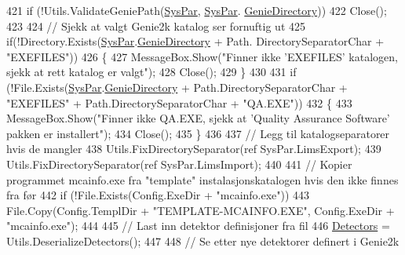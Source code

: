 \begin{DoxyCode}
421                 \textcolor{keywordflow}{if} (!Utils.ValidateGeniePath(\hyperlink{class_scintilab_1_1_form_main_ad41498eb151a72c77ad94c7285d0f506}{SysPar}, \hyperlink{class_scintilab_1_1_form_main_ad41498eb151a72c77ad94c7285d0f506}{SysPar}.
      \hyperlink{class_scintilab_1_1_system_parameters_a0a5d782455fab30269e4cd8263f89e99}{GenieDirectory}))
422                     Close();
423 
424                 \textcolor{comment}{// Sjekk at valgt Genie2k katalog ser fornuftig ut}
425                 \textcolor{keywordflow}{if}(!Directory.Exists(\hyperlink{class_scintilab_1_1_form_main_ad41498eb151a72c77ad94c7285d0f506}{SysPar}.\hyperlink{class_scintilab_1_1_system_parameters_a0a5d782455fab30269e4cd8263f89e99}{GenieDirectory} + Path.
      DirectorySeparatorChar + \textcolor{stringliteral}{"EXEFILES"}))
426                 \{
427                     MessageBox.Show(\textcolor{stringliteral}{"Finner ikke 'EXEFILES' katalogen, sjekk at rett katalog er valgt"});
428                     Close();
429                 \}
430 
431                 \textcolor{keywordflow}{if} (!File.Exists(\hyperlink{class_scintilab_1_1_form_main_ad41498eb151a72c77ad94c7285d0f506}{SysPar}.\hyperlink{class_scintilab_1_1_system_parameters_a0a5d782455fab30269e4cd8263f89e99}{GenieDirectory} + Path.DirectorySeparatorChar + \textcolor{stringliteral}{
      "EXEFILES"} + Path.DirectorySeparatorChar + \textcolor{stringliteral}{"QA.EXE"}))
432                 \{
433                     MessageBox.Show(\textcolor{stringliteral}{"Finner ikke QA.EXE, sjekk at 'Quality Assurance Software' pakken er
       installert"});
434                     Close();
435                 \}
436 
437                 \textcolor{comment}{// Legg til katalogseparatorer hvis de mangler}
438                 Utils.FixDirectorySeparator(ref SysPar.LimsExport);
439                 Utils.FixDirectorySeparator(ref SysPar.LimsImport);
440 
441                 \textcolor{comment}{// Kopier programmet mcainfo.exe fra "template" instalasjonskatalogen hvis den ikke finnes
       fra før}
442                 \textcolor{keywordflow}{if} (!File.Exists(Config.ExeDir + \textcolor{stringliteral}{"mcainfo.exe"}))
443                     File.Copy(Config.TemplDir + \textcolor{stringliteral}{"TEMPLATE-MCAINFO.EXE"}, Config.ExeDir + \textcolor{stringliteral}{"mcainfo.exe"});
444 
445                 \textcolor{comment}{// Last inn detektor definisjoner fra fil}
446                 \hyperlink{class_scintilab_1_1_form_main_a88f16134102d9e4c5630adf5ff97f090}{Detectors} = Utils.DeserializeDetectors();
447 
448                 \textcolor{comment}{// Se etter nye detektorer definert i Genie2k}

\end{DoxyCode}

